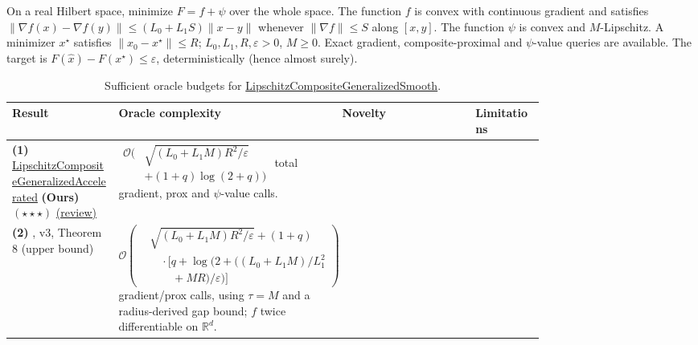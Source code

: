 \begin{table}[tp]
\centering
\caption{Sufficient oracle budgets for \href{https://github.com/k3nfalt/longtails/blob/main/LongTails/Setups/LipschitzCompositeGeneralizedSmooth.lean}{LipschitzCompositeGeneralizedSmooth}.}\label{tab:LipschitzCompositeGeneralizedSmooth}
\parbox{\linewidth}{\footnotesize On a real Hilbert space, minimize $F=f+\psi$ over the whole space. The function $f$ is convex with continuous gradient and satisfies $\|\nabla f(x)-\nabla f(y)\|\le (L_0+L_1 S)\|x-y\|$ whenever $\|\nabla f\|\le S$ along $[x,y]$. The function $\psi$ is convex and $M$-Lipschitz. A minimizer $x^\star$ satisfies $\|x_0-x^\star\|\le R$; $L_0,L_1,R,\varepsilon>0$, $M\ge0$. Exact gradient, composite-proximal and $\psi$-value queries are available. The target is $F(\hat x)-F(x^\star)\le\varepsilon$, deterministically (hence almost surely).}\par\smallskip
\begin{threeparttable}
\footnotesize
\setlength{\tabcolsep}{4pt}\renewcommand{\arraystretch}{1.25}
\begin{tabularx}{\linewidth}{@{}>{\raggedright\arraybackslash}p{0.20\linewidth}>{\raggedright\arraybackslash}p{0.32\linewidth}>{\raggedright\arraybackslash}p{0.25\linewidth}>{\raggedright\arraybackslash}X@{}}
\toprule
\textbf{Result} & \textbf{Oracle complexity} & \textbf{Novelty} & \textbf{Limitations} \\
\midrule
\textbf{(1)} \href{https://github.com/k3nfalt/longtails/blob/main/LongTails/Theorems/LipschitzCompositeGeneralizedAccelerated.lean}{Lipschitz\allowbreak Composite\allowbreak Generalized\allowbreak Accelerated} \textbf{(Ours)} $(\star\star\star)$ \href{https://github.com/k3nfalt/longtails/blob/main/scripts/reviews/LipschitzCompositeGeneralizedAccelerated.md}{(review)}
& $\begin{aligned}\mathcal{O}\!\bigl(&\sqrt{(L_0+L_1M)R^2/\varepsilon}\\&+(1+q)\log(2+q)\bigr)\end{aligned}$ total gradient, prox and $\psi$-value calls.
& & \\
\midrule[1.2pt]
\textbf{(2)} \citep{LiLaiAnHuWen2026v3Composite}, v3, Theorem 8 (upper bound)
& $\mathcal{O}\!\left(\begin{aligned}&\sqrt{(L_0+L_1M)R^2/\varepsilon}+(1+q)\\&\quad{}\cdot\bigl[q+\log\!\bigl(2+((L_0+L_1M)/L_1^2\\&\qquad{}+MR)/\varepsilon\bigr)\bigr]\end{aligned}\right)$ gradient/prox calls, using $\tau=M$ and a radius-derived gap bound; $f$ twice differentiable on $\mathbb{R}^d$.

\end{tabularx}
\end{threeparttable}
\end{table}
